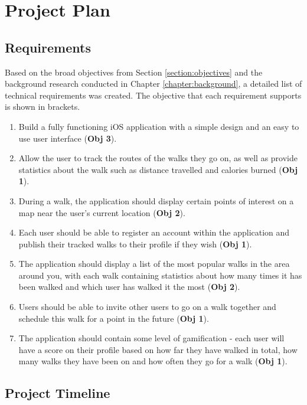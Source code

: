 \chapter{Project Plan}

\section{Requirements} \label{section:requirements}

Based on the broad objectives from Section \ref{section:objectives} and the background research conducted in Chapter \ref{chapter:background}, a detailed list of technical requirements was created. The objective that each requirement supports is shown in brackets.


\begin{enumerate}[label=\textbf{Req \arabic*}]
    \item Build a fully functioning iOS application with a simple design and an easy to use user interface (\textbf{Obj 3}).
    \item Allow the user to track the routes of the walks they go on, as well as provide statistics about the walk such as distance travelled and calories burned (\textbf{Obj 1}).
    \item During a walk, the application should display certain points of interest on a map near the user's current location (\textbf{Obj 2}).
    \item Each user should be able to register an account within the application and publish their tracked walks to their profile if they wish (\textbf{Obj 1}).
    \item The application should display a list of the most popular walks in the area around you, with each walk containing statistics about how many times it has been walked and which user has walked it the most (\textbf{Obj 2}).
    \item Users should be able to invite other users to go on a walk together and schedule this walk for a point in the future (\textbf{Obj 1}).
    \item The application should contain some level of gamification - each user will have a score on their profile based on how far they have walked in total, how many walks they have been on and how often they go for a walk (\textbf{Obj 1}).
\end{enumerate}

\section{Project Timeline} \label{section:project-timeline}

